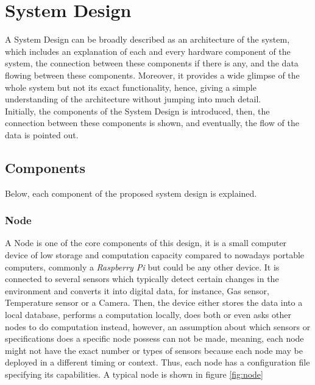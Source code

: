 \section{System Design }
A System Design can be broadly described as an architecture of the system, which includes an explanation of each and every hardware component of the system, the connection between these components if there is any, and the data flowing between these components. Moreover, it provides a wide glimpse of the whole system but not its exact functionality, hence, giving a simple understanding of the architecture without jumping into much detail.\\
Initially, the components of the System Design is introduced, then, the connection between these components is shown, and eventually, the flow of the data is pointed out.

\subsection{Components}
\label{sub:components}
Below, each component of the proposed system design is explained.

\subsubsection{Node}
\label{subsub:node}
A Node is one of the core components of this design, it is a small computer device of low storage and computation capacity compared to nowadays portable computers, commonly a \textit{Raspberry Pi} but could be any other device. It is connected to several sensors which typically detect certain changes in the environment and converts it into digital data, for instance, Gas sensor, Temperature sensor or a Camera. Then, the device either stores the data into a local database, performs a computation locally, does both or even asks other nodes to do computation instead, however, an assumption about which sensors or specifications does a specific node  possess can not be made, meaning, each node might not have the exact number or types of sensors because each node may be deployed in a different timing or context. Thus, each node has a configuration file specifying its capabilities. A typical node is shown in figure \ref{fig:node}

